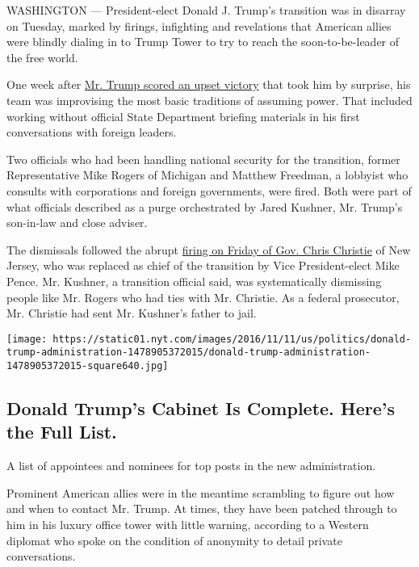 WASHINGTON --- President-elect Donald J. Trump's transition was in
disarray on Tuesday, marked by firings, infighting and revelations that
American allies were blindly dialing in to Trump Tower to try to reach
the soon-to-be-leader of the free world.

One week after
\href{http://www.nytimes.com/2016/11/09/us/politics/hillary-clinton-donald-trump-president.html}{Mr.
Trump scored an upset victory} that took him by surprise, his team was
improvising the most basic traditions of assuming power. That included
working without official State Department briefing materials in his
first conversations with foreign leaders.

Two officials who had been handling national security for the
transition, former Representative Mike Rogers of Michigan and Matthew
Freedman, a lobbyist who consults with corporations and foreign
governments, were fired. Both were part of what officials described as a
purge orchestrated by Jared Kushner, Mr. Trump's son-in-law and close
adviser.

The dismissals followed the abrupt
\href{http://www.nytimes.com/2016/11/12/us/politics/trump-cabinet.html}{firing
on Friday of Gov. Chris Christie} of New Jersey, who was replaced as
chief of the transition by Vice President-elect Mike Pence. Mr. Kushner,
a transition official said, was systematically dismissing people like
Mr. Rogers who had ties with Mr. Christie. As a federal prosecutor, Mr.
Christie had sent Mr. Kushner's father to jail.

\href{https://www.nytimes.com/interactive/2016/us/politics/donald-trump-administration.html}{}

\texttt{[image: https://static01.nyt.com/images/2016/11/11/us/politics/donald-trump-administration-1478905372015/donald-trump-administration-1478905372015-square640.jpg]}

\hypertarget{donald-trumps-cabinet-is-complete-heres-the-full-list}{%
\subsection{Donald Trump's Cabinet Is Complete. Here's the Full
List.}\label{donald-trumps-cabinet-is-complete-heres-the-full-list}}

A list of appointees and nominees for top posts in the new
administration.

Prominent American allies were in the meantime scrambling to figure out
how and when to contact Mr. Trump. At times, they have been patched
through to him in his luxury office tower with little warning, according
to a Western diplomat who spoke on the condition of anonymity to detail
private conversations.

